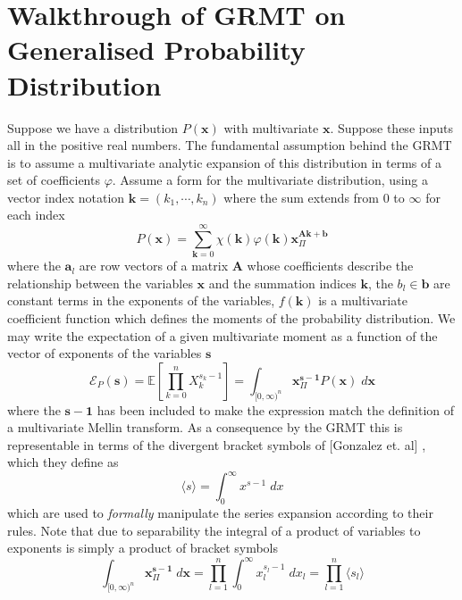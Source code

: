 \documentclass{article}
\begin{document}
\section{Walkthrough of GRMT on Generalised Probability Distribution}
Suppose we have a distribution $P(\mathbf{x})$ with multivariate $\mathbf{x}$. Suppose these inputs all in the positive real numbers. The fundamental assumption behind the GRMT is to assume a multivariate analytic expansion of this distribution in terms of a set of coefficients $\varphi$. Assume a form for the multivariate distribution, using a vector index notation $\mathbf{k} = (k_1, \cdots, k_n)$ where the sum extends from $0$ to $\infty$ for each index
\begin{equation}
P(\mathbf{x}) = \sum_{\mathbf{k}=0}^\infty  \chi(\mathbf{k})\varphi(\mathbf{k})\mathbf{x}^{\mathbf{A}\mathbf{k}+\mathbf{b}}_\Pi
\end{equation}
where the $\mathbf{a}_l$ are row vectors of a matrix $\mathbf{A}$ whose coefficients describe the relationship between the variables $\mathbf{x}$ and the summation indices $\mathbf{k}$, the $b_l \in \mathbf{b}$ are constant terms in the exponents of the variables, $f(\mathbf{k})$ is a multivariate coefficient function which defines the moments of the probability distribution. We may write the expectation of a given multivariate moment as a function of the vector of exponents of the variables $\mathbf{s}$
$$
\mathcal{E}_P(\mathbf{s}) = \mathbb{E}\left[\prod_{k=0}^n X_k^{s_k-1}\right] =\int_{[0,\infty)^{n}} \mathbf{x}_\Pi^{\mathbf{s}-\mathbf{1}} P(\mathbf{x}) \; d \mathbf{x}
$$
where the $\mathbf{s}-\mathbf{1}$ has been included to make the expression match the definition of a multivariate Mellin transform. As a consequence by the GRMT this is representable in terms of the divergent bracket symbols of [Gonzalez et. al] \citep{Gonzalez2015}, which they define as
\begin{equation}
\langle s \rangle = \int_0^\infty x^{s-1} \; dx
\end{equation}
which are used to \emph{formally} manipulate the series expansion according to their rules. Note that due to separability the integral of a product of variables to exponents is simply a product of bracket symbols
\begin{equation}
\int_{[0,\infty)^n} \mathbf{x}^{\mathbf{s-1}}_\Pi\;d \mathbf{x} = \prod_{l=1}^n \int_0^\infty x_l^{s_l-1} \; dx_l = \prod_{l=1}^n \langle s_l \rangle
\label{eqn:bracket}
\end{equation} 
\end{document}
